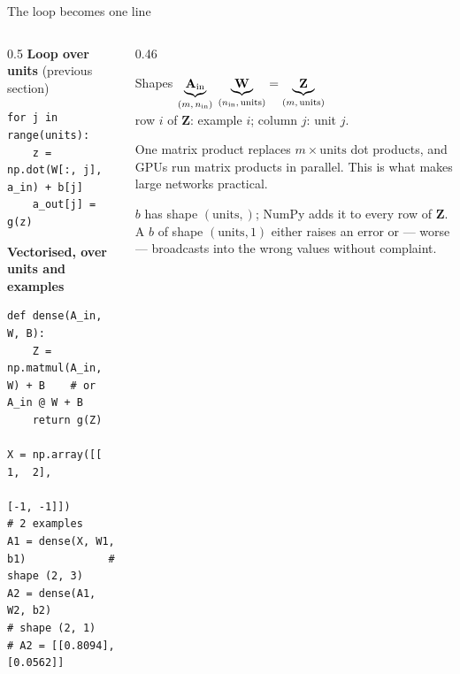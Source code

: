 \documentclass[aspectratio=169,10pt]{beamer}
\begin{document}
\begin{frame}[fragile]{The loop becomes one line}
  \begin{columns}[T,onlytextwidth]
    \begin{column}{0.5\textwidth}
      \footnotesize\textbf{Loop over units} (previous section)
\begin{lstlisting}
for j in range(units):
    z = np.dot(W[:, j], a_in) + b[j]
    a_out[j] = g(z)
\end{lstlisting}
      \vspace{1mm}
      \footnotesize\textbf{Vectorised, over units and examples}
\begin{lstlisting}
def dense(A_in, W, B):
    Z = np.matmul(A_in, W) + B    # or A_in @ W + B
    return g(Z)

X = np.array([[ 1,  2],
              [-1, -1]])          # 2 examples
A1 = dense(X, W1, b1)             # shape (2, 3)
A2 = dense(A1, W2, b2)            # shape (2, 1)
# A2 = [[0.8094], [0.0562]]
\end{lstlisting}
    \end{column}
    \begin{column}{0.46\textwidth}
      \footnotesize
      \begin{block}{Shapes}
        \centering
        $\underbrace{\mathbf{A}_{\text{in}}}_{(m,\,n_{\text{in}})}\;
         \underbrace{\mathbf{W}}_{(n_{\text{in}},\,\text{units})}
         = \underbrace{\mathbf{Z}}_{(m,\,\text{units})}$\\[2pt]
        row $i$ of $\mathbf{Z}$: example $i$; column $j$: unit $j$.
      \end{block}
      \begin{keyidea}
        One matrix product replaces $m\times\text{units}$ dot products, and GPUs run matrix
        products in parallel. This is what makes large networks practical.
      \end{keyidea}
      \begin{pitfall}[Broadcasting $B$]
        \footnotesize $b$ has shape $(\text{units},)$; NumPy adds it to every row of
        $\mathbf{Z}$. A $b$ of shape $(\text{units},1)$ either raises an error or --- worse --- broadcasts
        into the wrong values without complaint.
      \end{pitfall}
    \end{column}
  \end{columns}
\end{frame}
\end{document}
